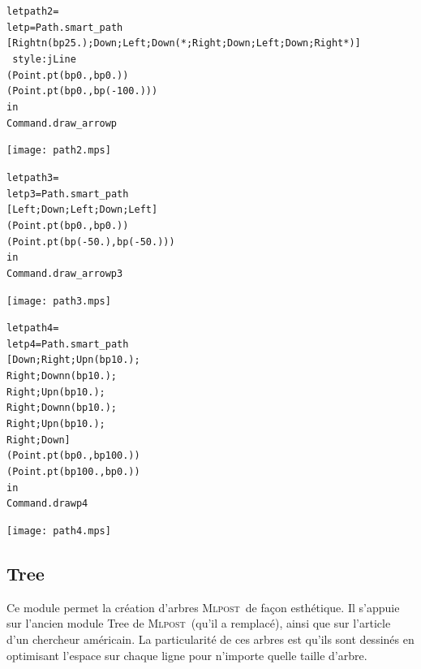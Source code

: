 \documentclass[a4paper,12pt]{article}
\newcommand{\mlpost}{\textsc{Mlpost}}
\begin{document}
\bigskip
\begin{minipage}{0.5\linewidth}
  \begin{alltt}
    let path2 = 
  let p = Path.smart_path 
    [Rightn(bp 25.);Down;Left;Down(* ;Right;Down;Left;Down;Right *)]
    ~style:jLine
    (Point.pt (bp 0.,bp 0.)) 
    (Point.pt (bp 0.,bp (-100.)))
  in
  Command.draw_arrow p
  \end{alltt}
\end{minipage}
\begin{minipage}{0.5\linewidth}
\begin{center}
\texttt{[image: path2.mps]}
\end{center}
\end{minipage}

\bigskip
\begin{minipage}{0.5\linewidth}
  \begin{alltt}
    let path3 = 
    let p3 = Path.smart_path 
    [Left;Down;Left;Down;Left] 
    (Point.pt (bp 0.,bp 0.)) 
    (Point.pt (bp (-50.),bp (-50.)))
    in
    Command.draw_arrow p3
  \end{alltt}
\end{minipage}
\begin{minipage}{0.5\linewidth}
\begin{center}
\texttt{[image: path3.mps]}
\end{center}
\end{minipage}

\bigskip
\begin{minipage}{0.5\linewidth}
  \begin{alltt}
    let path4 = 
    let p4 = Path.smart_path 
    [Down;Right;Upn (bp 10.);
      Right;Downn (bp 10.);
      Right;Upn (bp 10.);
      Right;Downn (bp 10.);
      Right;Upn (bp 10.);
      Right;Down]
    (Point.pt (bp 0.,bp 100.)) 
    (Point.pt (bp 100.,bp 0.))
    in
    Command.draw p4
  \end{alltt}
\end{minipage}
\begin{minipage}{0.5\linewidth}
\begin{center}
\texttt{[image: path4.mps]}
\end{center}
\end{minipage}


\subsection{Tree}
Ce module permet la création d'arbres \mlpost\ de façon esthétique.
Il s'appuie sur l'ancien module Tree de \mlpost\ (qu'il a remplacé), ainsi que sur l'article d'un chercheur américain. \cite{tree}
La particularité de ces arbres est qu'ils sont dessinés en optimisant l'espace sur chaque ligne pour n'importe quelle taille d'arbre.
\bigskip 
\end{document}

